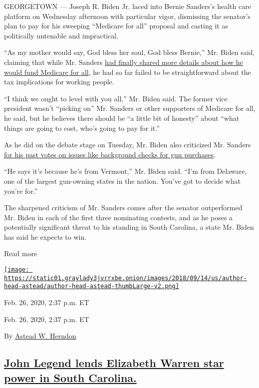 GEORGETOWN --- Joseph R. Biden Jr. laced into Bernie Sanders's health
care platform on Wednesday afternoon with particular vigor, dismissing
the senator's plan to pay for his sweeping ``Medicare for all'' proposal
and casting it as politically untenable and impractical.

``As my mother would say, God bless her soul, God bless Bernie,'' Mr.
Biden said, claiming that while Mr. Sanders
\href{https://www.nytimes3xbfgragh.onion/2020/02/24/us/politics/bernie-sanders-medicare-for-all.html}{had
finally shared more details about how he would fund Medicare for all},
he had so far failed to be straightforward about the tax implications
for working people.

``I think we ought to level with you all,'' Mr. Biden said. The former
vice president wasn't ``picking on'' Mr. Sanders or other supporters of
Medicare for all, he said, but he believes there should be ``a little
bit of honesty'' about ``what things are going to cost, who's going to
pay for it.''

As he did on the debate stage on Tuesday, Mr. Biden also criticized Mr.
Sanders
\href{https://www.nytimes3xbfgragh.onion/2020/02/25/us/politics/bernie-sanders-brady-bill-guns.html}{for
his past votes on issues like background checks for gun purchases}.

``He says it's because he's from Vermont,'' Mr. Biden said. ``I'm from
Delaware, one of the largest gun-owning states in the nation. You've got
to decide what you're for.''

The sharpened criticism of Mr. Sanders comes after the senator
outperformed Mr. Biden in each of the first three nominating contests,
and as he poses a potentially significant threat to his standing in
South Carolina, a state Mr. Biden has said he expects to win.

Read more

\href{https://www.nytimes3xbfgragh.onion/by/astead-w-herndon}{\texttt{[image: https://static01.graylady3jvrrxbe.onion/images/2018/09/14/us/author-head-astead/author-head-astead-thumbLarge-v2.png]}}

Feb. 26, 2020, 2:37 p.m. ET

Feb. 26, 2020, 2:37 p.m. ET

By \href{https://www.nytimes3xbfgragh.onion/by/astead-w-herndon}{Astead
W. Herndon}

\hypertarget{john-legend-lends-elizabeth-warren-star-power-in-south-carolina}{%
\subsection{\texorpdfstring{\protect\hyperlink{john-legend-lends-elizabeth-warren-star-power-in-south-carolina}{John
Legend lends Elizabeth Warren star power in South
Carolina.}}{John Legend lends Elizabeth Warren star power in South Carolina.}}\label{john-legend-lends-elizabeth-warren-star-power-in-south-carolina}}

